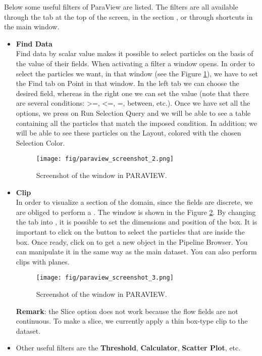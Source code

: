 Below some useful filters of ParaView are listed. The filters are all available 
through the  tab at the top of the screen, in the section
, or through shortcuts in the main window.\\
\begin{itemize} 
\item \textbf{Find Data}\\
Find data by scalar value makes it possible to select particles 
on the basis of the value of their fields. When activating a filter
a window opens. In order to select the particles we want, 
in that window (see the Figure \ref{fig:paraview_screenshot_2}),
we have to set the Find tab on Point in that window. 
In the left tab we can choose the desired field, whereas in the right one 
we can set the value (note that there are several conditions: >=, <=, =, between, etc.). 
Once we have set all the options, we press on Run Selection Query and we 
will be able to see a table containing all the particles that match 
the imposed condition. 
In addition; we will be able to see these particles on 
the Layout, colored with the chosen Selection Color.
\begin{figure}[h]
  \begin{center}
    \texttt{[image: fig/paraview\_screenshot\_2.png]}
    \caption{Screenshot of the  window in PARAVIEW.}\label{fig:paraview_screenshot_2}   
  \end{center}
\end{figure}

\item \textbf{Clip} \\
In order to visualize a section of the domain, 
since the fields are discrete, we are obliged to perform a .
The  window is shown in the Figure \ref{fig:paraview_screenshot_3}.  
By changing the  tab into , it is possible to set the dimensions 
and position of the box. It is important to click on the  button 
to select the particles that are inside the box. Once ready, click on 
 to get a new  object in the Pipeline Browser.
You can manipulate it in the same way as the main dataset. You can
also perform clips with planes. \\
\begin{figure}[h]
  \begin{center}
    \texttt{[image: fig/paraview\_screenshot\_3.png]}
    \caption{Screenshot of the  window in PARAVIEW.}\label{fig:paraview_screenshot_3}   
  \end{center}
\end{figure}
\textbf{Remark}: the Slice option does not work because the flow fields are not continuous.
To make a slice, we currently apply a thin box-type clip to the dataset.\\

\item Other useful filters are the \textbf{Threshold}, \textbf{Calculator}, \textbf{Scatter Plot}, etc.

\end{itemize}

